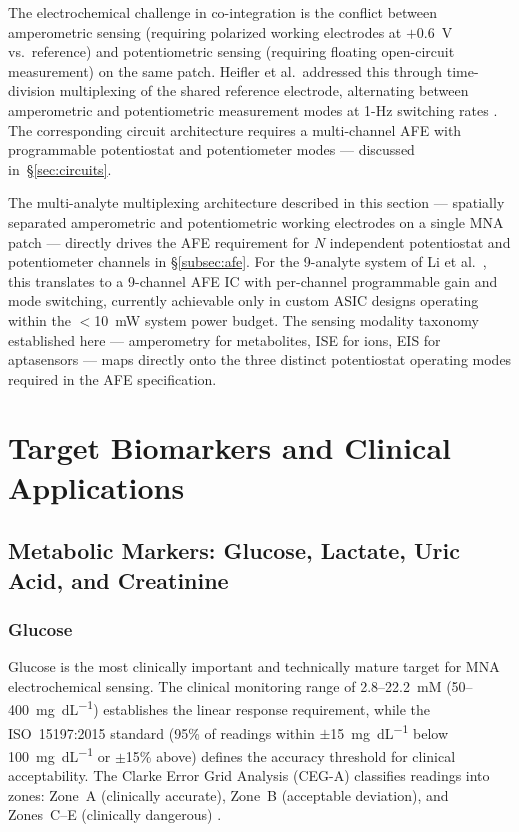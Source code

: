 \documentclass[review,1p]{elsarticle}
\begin{document}
The electrochemical challenge in co-integration is the conflict between amperometric sensing (requiring polarized working electrodes at $+0.6$~V vs.\ reference) and potentiometric sensing (requiring floating open-circuit measurement) on the same patch. Heifler et al.\ addressed this through time-division multiplexing of the shared reference electrode, alternating between amperometric and potentiometric measurement modes at 1-Hz switching rates \cite{Heifler2021}. The corresponding circuit architecture requires a multi-channel AFE with programmable potentiostat and potentiometer modes — discussed in~\S\ref{sec:circuits}.

The multi-analyte multiplexing architecture described in this section — spatially separated amperometric and potentiometric working electrodes on a single MNA patch — directly drives the AFE requirement for $N$ independent potentiostat and potentiometer channels in \S\ref{subsec:afe}. For the 9-analyte system of Li et al.\ \cite{Li2025Innovation}, this translates to a 9-channel AFE IC with per-channel programmable gain and mode switching, currently achievable only in custom ASIC designs operating within the $<$10~mW system power budget. The sensing modality taxonomy established here — amperometry for metabolites, ISE for ions, EIS for aptasensors — maps directly onto the three distinct potentiostat operating modes required in the AFE specification.


\section{Target Biomarkers and Clinical Applications}
\label{sec:biomarkers}

\subsection{Metabolic Markers: Glucose, Lactate, Uric Acid, and Creatinine}
\label{subsec:metabolic}

\subsubsection{Glucose}

Glucose is the most clinically important and technically mature target for MNA electrochemical sensing. The clinical monitoring range of 2.8--22.2~mM (50--400~mg~dL\textsuperscript{$-1$}) establishes the linear response requirement, while the ISO~15197:2015 standard (95\% of readings within $\pm$15~mg~dL\textsuperscript{$-1$} below 100~mg~dL\textsuperscript{$-1$} or $\pm$15\% above) defines the accuracy threshold for clinical acceptability. The Clarke Error Grid Analysis (CEG-A) classifies readings into zones: Zone~A (clinically accurate), Zone~B (acceptable deviation), and Zones~C--E (clinically dangerous) \cite{Keum2022Clarke}.
\end{document}
